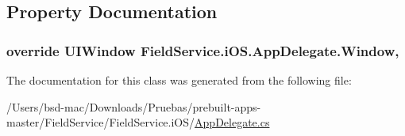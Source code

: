 \subsection{Property Documentation}
\hypertarget{class_field_service_1_1i_o_s_1_1_app_delegate_aad78e30996c7c8046d9a2335e66312af}{
\subsubsection[{Window}]{\setlength{\rightskip}{0pt plus 5cm}override U\+I\+Window Field\+Service.\+i\+O\+S.\+App\+Delegate.\+Window\hspace{0.3cm}{\ttfamily [get]}, {\ttfamily [set]}}}\label{class_field_service_1_1i_o_s_1_1_app_delegate_aad78e30996c7c8046d9a2335e66312af}


The documentation for this class was generated from the following file\+:\begin{DoxyCompactItemize}
\item 
/\+Users/bsd-\/mac/\+Downloads/\+Pruebas/prebuilt-\/apps-\/master/\+Field\+Service/\+Field\+Service.\+i\+O\+S/\hyperlink{_field_service_8i_o_s_2_app_delegate_8cs}{App\+Delegate.\+cs}\end{DoxyCompactItemize}

